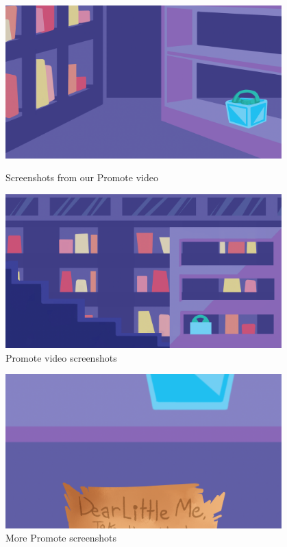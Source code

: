\begin{figure}[ht]
\centering
\begin{minipage}[b]{.48\textwidth}
  \centering
  \includegraphics[width=0.95\textwidth]{Meetings/January/01-13-22/1_13_22 - Falon Jones.png}
  \caption{Screenshots from our Promote video}
  \label{fig:011322_7}
\end{minipage}%
\hfill%
\begin{minipage}[b]{.48\textwidth}
  \centering
  \includegraphics[width=0.95\textwidth]{Meetings/January/01-13-22/1.13.22 - Falon Jones.png}
  \caption{Promote video screenshots}
  \label{fig:011322_8}
\end{minipage}
\end{figure}


\begin{figure}[htp]
\centering
\includegraphics[width=0.95\textwidth, angle=0]{Meetings/January/01-13-22/1_13_22 - Falon Jones (1).png}
\caption{More Promote screenshots}
\label{fig:011322_9}
\end{figure}

